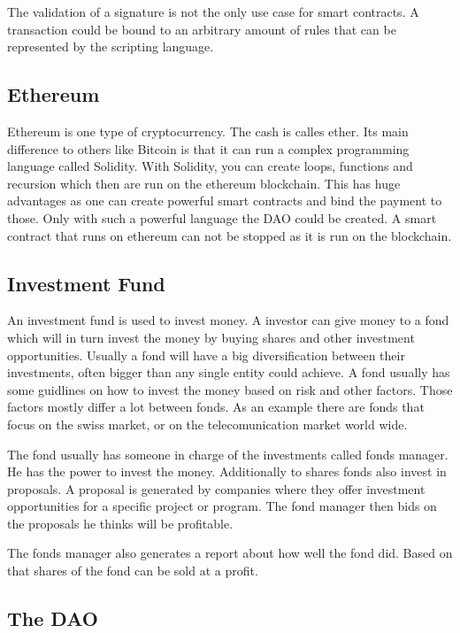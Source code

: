 \documentclass[a4paper, 11pt]{scrartcl}
\begin{document}
The validation of a signature is not the only use case for smart contracts.
A transaction could be bound to an arbitrary amount of rules that can be represented by the scripting language. \cite{blockchainKai}

\subsection{Ethereum}

Ethereum is one type of cryptocurrency.
The cash is calles ether.
Its main difference to others like Bitcoin is that it can run a complex programming language called Solidity.
With Solidity, you can create loops, functions and recursion which then are run on the ethereum blockchain.
This has huge advantages as one can create powerful smart contracts and bind the payment to those.
Only with such a powerful language the DAO could be created. 
A smart contract that runs on ethereum can not be stopped as it is run on the blockchain. \cite{eth}

\subsection{Investment Fund}

An investment fund is used to invest money. A investor can give money to a fond which will in turn invest the money by buying shares and other investment opportunities. Usually a fond will have a big diversification between their investments, often bigger than any single entity could achieve. A fond usually has some guidlines on how to invest the money based on risk and other factors. Those factors mostly differ a lot between fonds. As an example there are fonds that focus on the swiss market, or on the telecomunication market world wide. \cite{fond}

The fond usually has someone in charge of the investments called fonds manager. He has the power to invest the money. Additionally to shares fonds also invest in proposals. A proposal is generated by companies where they offer investment opportunities for a specific project or program. The fond manager then bids on the proposals he thinks will be profitable. \cite{proposal}

The fonds manager also generates a report about how well the fond did. Based on that shares of the fond can be sold at a profit. 

\subsection{The DAO}
\end{document}
